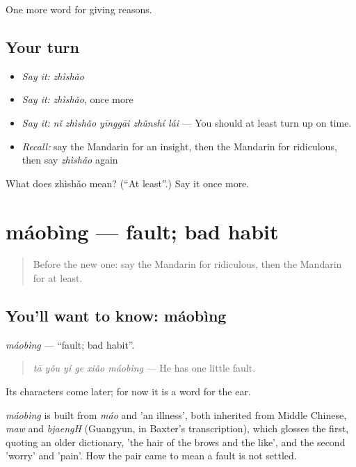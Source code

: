 \begin{grammarlens}[title={What you've built}]
One more word for giving reasons.
\end{grammarlens}

\subsection*{Your turn}
\begin{itemize}
\raggedright
  \item \emph{Say it:} \emph{zhìshǎo}
  \item \emph{Say it:} \emph{zhìshǎo}, once more
  \item \emph{Say it:} \emph{nǐ zhìshǎo yīnggāi zhǔnshí lái} — You should at least turn up on time.
  \item \emph{Recall:} say the Mandarin for an insight, then the Mandarin for ridiculous, then say \emph{zhìshǎo} again
\end{itemize}

\begin{tcolorbox}[breakable,colback=teal!4,colframe=teal!35!black,title={Before you move on}]
What does zhìshǎo mean? (\textquotedblleft{}At least\textquotedblright{}.) Say it once more.
\end{tcolorbox}
\section[máobìng]{máobìng — fault; bad habit}

\label{lesson:ZH-C368-maobing}



\begin{quote}
Before the new one: say the Mandarin for ridiculous, then the Mandarin for at least.
\end{quote}

\subsection*{You'll want to know: máobìng}
\emph{máobìng} — \textquotedblleft{}fault; bad habit\textquotedblright{}.

\begin{quote}
\emph{tā yǒu yí ge xiǎo máobìng} — He has one little fault.
\end{quote}

Its characters come later; for now it is a word for the ear.

\begin{cousinweb}
\emph{máobìng} is built from \emph{máo} and  'an illness', both inherited from Middle Chinese, \emph{maw} and \emph{bjaengH} (Guangyun, in Baxter's transcription), which glosses the first, quoting an older dictionary, 'the hair of the brows and the like', and the second 'worry' and 'pain'. How the pair came to mean a fault is not settled.
\end{cousinweb}

